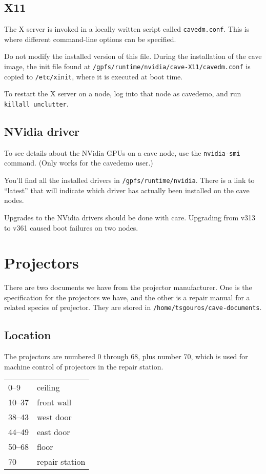 \documentclass[11pt]{article}
\newcommand{\cmd}[1]{\texttt{#1}\xspace}
\begin{document}
\subsection{X11}

The X server is invoked in a locally written script called
\cmd{cavedm.conf}.  This is where different command-line options
can be specified.

Do not modify the installed version of this file.  During the
installation of the cave image, the init file found at
\cmd{/gpfs/runtime/nvidia/cave-X11/cavedm.conf} is copied to
\cmd{/etc/xinit}, where it is executed at boot time.

To restart the X server on a node, log into that node as cavedemo, and
run \cmd{killall unclutter}.


\subsection{NVidia driver}

To see details about the NVidia GPUs on a cave node, use the
\cmd{nvidia-smi} command.  (Only works for the cavedemo user.)

You'll find all the installed drivers in
\cmd{/gpfs/runtime/nvidia}.  There is a link to ``latest'' that
will indicate which driver has actually been installed on the cave nodes.

Upgrades to the NVidia drivers should be done with care.  Upgrading
from v313 to v361 caused boot failures on two nodes.


\section{Projectors}

There are two documents we have from the projector manufacturer.  One
is the specification for the projectors we have, and the other is a
repair manual for a related species of projector.  They are stored in
\cmd{/home/tsgouros/cave-documents}.


\subsection{Location}

The projectors are numbered 0 through 68, plus number 70, which is
used for machine control of projectors in the repair station.

\begin{center}
\begin{tabular}{ll}
0--9 & ceiling \\
10--37 & front wall \\
38--43 & west door \\
44--49 & east door \\
50--68 & floor \\
70 & repair station
\end{tabular}
\end{center}
\end{document}
